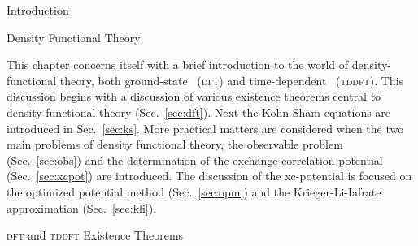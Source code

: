 \documentclass[letterpaper, 10 pt]{report}
\begin{document}
\onehalfspacing

\begin{chapter}{Introduction \label{chap:intro}}

\end{chapter}

\begin{chapter}{Density Functional Theory \label{chap:dft}}

   This chapter concerns itself with a brief introduction to the world of density-functional theory,
   both ground-state~\cite{dft-engel} (\textsc{dft}) and time-dependent~\cite{tddft, marques-1}
   (\textsc{tddft}). This discussion begins with a discussion of various existence theorems central to
   density functional theory (Sec.~\ref{sec:dft}). Next the Kohn-Sham equations are introduced in
   Sec.~\ref{sec:ks}. More practical matters are considered when the two main problems of density
   functional theory, the observable problem (Sec.~\ref{sec:obs}) and the determination of the
   exchange-correlation potential (Sec.~\ref{sec:xcpot}) are introduced. The discussion of the
   xc-potential is focused on the optimized potential method (Sec.~\ref{sec:opm}) and the
   Krieger-Li-Iafrate approximation (Sec.~\ref{sec:kli}).

   \begin{section}{\textsc{dft} and \textsc{tddft} Existence Theorems \label{sec:dft}}


\end{section}
\end{chapter}
\end{document}
